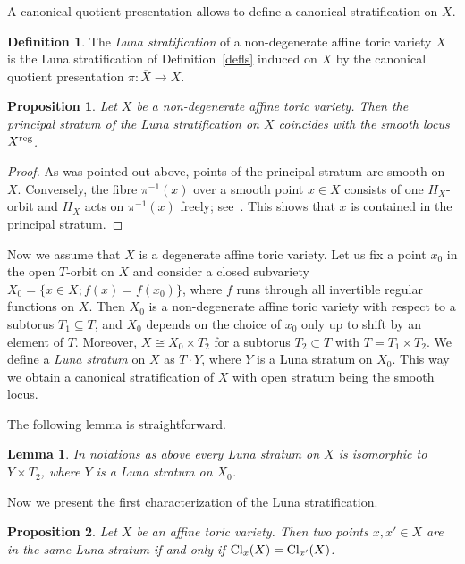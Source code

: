 \documentclass[12pt,a4paper]{amsart}
\theoremstyle{plain}
\newtheorem{lemma}{Lemma}
\newtheorem{proposition}{Proposition}
\theoremstyle{definition}
\newtheorem{definition}{Definition}
\begin{document}
A canonical quotient presentation allows to define a canonical stratification on $X$.

\begin{definition}
The {\it Luna stratification} of a non-degenerate affine toric variety $X$ is the Luna
stratification of Definition~\ref{defls} induced on $X$ by the canonical
quotient presentation $\pi:\overline{X} \to X$.
\end{definition}

\begin{proposition}
Let $X$ be a non-degenerate affine toric variety. Then
the principal stratum of the Luna stratification on $X$
coincides with the smooth locus $X^{\mathop{\rm reg}}$.
\end{proposition}

\begin{proof}
As was pointed out above, points of the principal stratum are smooth on $X$.
Conversely, the fibre $\pi^{-1}(x)$ over a smooth point $x\in X$ consists
of one $H_X$-orbit and $H_X$ acts on $\pi^{-1}(x)$ freely; see~\cite[Proposition~6.1.6]{ADHL}.
This shows that $x$ is contained in the principal stratum.
\end{proof}

Now we assume that $X$ is a degenerate affine toric variety. Let us fix a point $x_0$
in the open $T$-orbit on $X$ and consider a closed subvariety $X_0=\{x\in X ; f(x)=f(x_0)\}$,
where $f$ runs through all invertible regular functions on $X$. Then $X_0$ is a non-degenerate
affine toric variety with respect to a subtorus $T_1\subseteq T$, and $X_0$ depends on the
choice of $x_0$ only up to shift by an element of $T$. Moreover, $X\cong X_0 \times T_2$
for a subtorus $T_2\subset T$ with $T=T_1\times T_2$. We define a {\it Luna stratum}
on $X$ as $T\cdot Y$, where $Y$ is a Luna stratum on $X_0$.  This way we obtain
a canonical stratification of $X$ with open stratum being the smooth locus.

\smallskip

The following lemma is straightforward.

\begin{lemma} \label{lemred}
In notations as above every Luna stratum on $X$ is isomorphic to
$Y\times T_2$, where $Y$ is a Luna stratum on $X_0$.
\end{lemma}

Now we present the first characterization of the Luna stratification.

\begin{proposition} \label{prop23}
Let $X$ be an affine toric variety. Then two points $x,x'\in X$
are in the same Luna stratum if and only if ${\mathop{\rm Cl}}_x(X)={\mathop{\rm Cl}}_{x'}(X)$.
\end{proposition}
\end{document}
